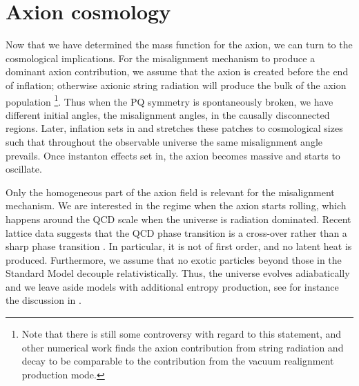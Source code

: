 \documentclass[preprint,nofootinbib]{revtex4}
\begin{document}
\begin{figure}[tbp]
\end{figure}

\section{Axion cosmology}
\label{sec:axion:cosmology}

Now that we have determined the mass function for the axion, we can turn to the cosmological implications. For the misalignment mechanism to produce a dominant axion contribution, we assume that the axion is created before the end of inflation; otherwise axionic string radiation will produce the bulk of the axion population \cite{davis:axion:string:1985,davis:axion:string:1986,davis:shellard:axion:string,dabholkar:quashnock:axion:string,battye:shellard:axion:string:1994b}\footnote{Note that there is still some controversy with regard to this statement, and other numerical work \cite{harari:sikivie:axion:string,hagmann:sikivie:axion:string} finds the axion contribution from string radiation and decay to be comparable to the contribution from the vacuum realignment production mode.}. Thus when the PQ symmetry is spontaneously broken, we have different initial angles, the misalignment angles, in the causally disconnected regions. Later, inflation sets in and stretches these patches to cosmological sizes such that throughout the observable universe the same misalignment angle prevails. Once instanton effects set in, the axion becomes massive and starts to oscillate.

Only the homogeneous part of the axion field is relevant for the misalignment mechanism. We are interested in the regime when the axion starts rolling, which happens around the QCD scale when the universe is radiation dominated. Recent lattice data suggests that the QCD phase transition is a cross-over rather than a sharp phase transition \cite{aoki:fodor:katz:szabo:transition:temperature}. In particular, it is not of first order, and no latent heat is produced. Furthermore, we assume that no exotic particles beyond those in the Standard Model decouple relativistically. Thus, the universe evolves adiabatically and we leave aside models with additional entropy production, see for instance the discussion in \cite{fox:pierce:scott:axion:cosmology}.
\end{document}
